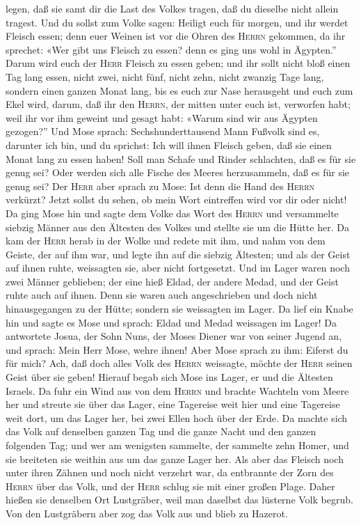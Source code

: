 legen, daß sie samt dir die Last des Volkes tragen, daß du dieselbe
nicht allein tragest.  Und du sollst zum Volke sagen:
Heiligt euch für morgen, und ihr werdet Fleisch essen; denn euer Weinen
ist vor die Ohren des \textsc{Herrn} gekommen, da ihr sprechet: «Wer
gibt uns Fleisch zu essen? denn es ging uns wohl in Ägypten.'' Darum
wird euch der \textsc{Herr} Fleisch zu essen geben;  und
ihr sollt nicht bloß einen Tag lang essen, nicht zwei, nicht fünf, nicht
zehn, nicht zwanzig Tage lang,  sondern einen ganzen
Monat lang, bis es euch zur Nase herausgeht und euch zum Ekel wird,
darum, daß ihr den \textsc{Herrn}, der mitten unter euch ist, verworfen
habt; weil ihr vor ihm geweint und gesagt habt: «Warum sind wir aus
Ägypten gezogen?''  Und Mose sprach: Sechshunderttausend
Mann Fußvolk sind es, darunter ich bin, und du sprichst: Ich will ihnen
Fleisch geben, daß sie einen Monat lang zu essen haben! 
Soll man Schafe und Rinder schlachten, daß es für sie genug sei? Oder
werden sich alle Fische des Meeres herzusammeln, daß es für sie genug
sei?  Der \textsc{Herr} aber sprach zu Mose: Ist denn die
Hand des \textsc{Herrn} verkürzt? Jetzt sollst du sehen, ob mein Wort
eintreffen wird vor dir oder nicht!  Da ging Mose hin und
sagte dem Volke das Wort des \textsc{Herrn} und versammelte siebzig
Männer aus den Ältesten des Volkes und stellte sie um die Hütte her.
 Da kam der \textsc{Herr} herab in der Wolke und redete
mit ihm, und nahm von dem Geiste, der auf ihm war, und legte ihn auf die
siebzig Ältesten; und als der Geist auf ihnen ruhte, weissagten sie,
aber nicht fortgesetzt.  Und im Lager waren noch zwei
Männer geblieben; der eine hieß Eldad, der andere Medad, und der Geist
ruhte auch auf ihnen. Denn sie waren auch angeschrieben und doch nicht
hinausgegangen zu der Hütte; sondern sie weissagten im Lager.
 Da lief ein Knabe hin und sagte es Mose und sprach:
Eldad und Medad weissagen im Lager!  Da antwortete Josua,
der Sohn Nuns, der Moses Diener war von seiner Jugend an, und sprach:
Mein Herr Mose, wehre ihnen!  Aber Mose sprach zu ihm:
Eiferst du für mich? Ach, daß doch alles Volk des \textsc{Herrn}
weissagte, möchte der \textsc{Herr} seinen Geist über sie geben!
 Hierauf begab sich Mose ins Lager, er und die Ältesten
Israels.  Da fuhr ein Wind aus von dem \textsc{Herrn} und
brachte Wachteln vom Meere her und streute sie über das Lager, eine
Tagereise weit hier und eine Tagereise weit dort, um das Lager her, bei
zwei Ellen hoch über der Erde.  Da machte sich das Volk
auf denselben ganzen Tag und die ganze Nacht und den ganzen folgenden
Tag; und wer am wenigsten sammelte, der sammelte zehn Homer, und sie
breiteten sie weithin aus um das ganze Lager her.  Als
aber das Fleisch noch unter ihren Zähnen und noch nicht verzehrt war, da
entbrannte der Zorn des \textsc{Herrn} über das Volk, und der
\textsc{Herr} schlug sie mit einer großen Plage.  Daher
hießen sie denselben Ort Lustgräber, weil man daselbst das lüsterne Volk
begrub.  Von den Lustgräbern aber zog das Volk aus und
blieb zu Hazerot.

